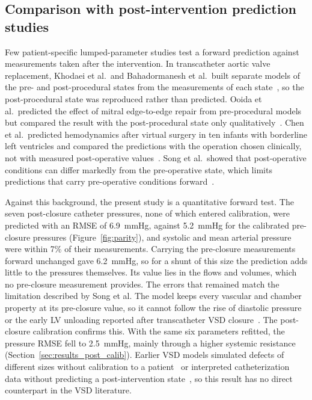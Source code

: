 \subsection{Comparison with post-intervention prediction studies}
\label{sec:disc_prediction}
Few patient-specific lumped-parameter studies test a forward prediction against measurements taken after the intervention. In transcatheter aortic valve replacement, Khodaei et al.\ and Bahadormanesh et al.\ built separate models of the pre- and post-procedural states from the measurements of each state~\cite{Khodaei2021,Bahadormanesh2023}, so the post-procedural state was reproduced rather than predicted. Ooida et al.\ predicted the effect of mitral edge-to-edge repair from pre-procedural models but compared the result with the post-procedural state only qualitatively~\cite{Ooida2024}. Chen et al.\ predicted hemodynamics after virtual surgery in ten infants with borderline left ventricles and compared the predictions with the operation chosen clinically, not with measured post-operative values~\cite{Chen2026BLV}. Song et al.\ showed that post-operative conditions can differ markedly from the pre-operative state, which limits predictions that carry pre-operative conditions forward~\cite{Song2025}.

Against this background, the present study is a quantitative forward test. The seven post-closure catheter pressures, none of which entered calibration, were predicted with an RMSE of 6.9~mmHg, against 5.2~mmHg for the calibrated pre-closure pressures (Figure~\ref{fig:parity}), and systolic and mean arterial pressure were within 7\% of their measurements.
Carrying the pre-closure measurements forward unchanged gave 6.2~mmHg, so for a shunt of this size the prediction adds little to the pressures themselves. Its value lies in the flows and volumes, which no pre-closure measurement provides.
The errors that remained match the limitation described by Song et al. The model keeps every vascular and chamber property at its pre-closure value, so it cannot follow the rise of diastolic pressure or the early LV unloading reported after transcatheter VSD closure~\cite{Yuan2025}. The post-closure calibration confirms this. With the same six parameters refitted, the pressure RMSE fell to 2.5~mmHg, mainly through a higher systemic resistance (Section~\ref{sec:results_post_calib}). Earlier VSD models simulated defects of different sizes without calibration to a patient~\cite{Colebank2026} or interpreted catheterization data without predicting a post-intervention state~\cite{Ferrero2026Shunts}, so this result has no direct counterpart in the VSD literature.

